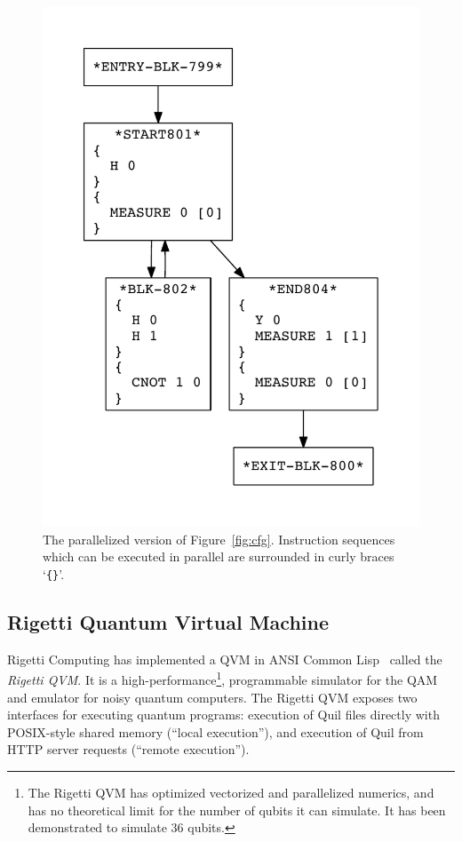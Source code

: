 \documentclass[conference]{IEEEtran}
\begin{document}
\begin{figure}[ht]
    \centering
    \includegraphics[scale=0.5]{loop-parallel.pdf}
    \caption{The parallelized version of Figure~\ref{fig:cfg}. Instruction sequences which can be executed in parallel are surrounded in curly braces `\texttt{\{\}}'.}
    \label{fig:cfg-parallel}
\end{figure}

\subsection{Rigetti Quantum Virtual Machine}\label{sec:qvm}
Rigetti Computing has implemented a QVM in ANSI Common Lisp~\cite{ANSI:1996:ANS} called the \emph{Rigetti QVM}. It is a high-performance\footnote{The Rigetti QVM has optimized vectorized and parallelized numerics, and has no theoretical limit for the number of qubits it can simulate. It has been demonstrated to simulate 36 qubits.}, programmable simulator for the QAM and emulator for noisy quantum computers. The Rigetti QVM exposes two interfaces for executing quantum programs: execution of Quil files directly with POSIX-style shared memory (``local execution''), and execution of Quil from HTTP server requests (``remote execution'').
\end{document}
